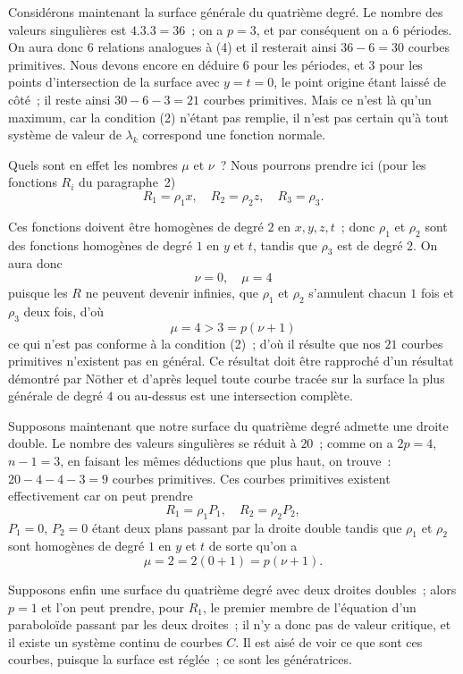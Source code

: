 \documentclass{article}
\begin{document}
Considérons maintenant la surface générale du quatrième degré. Le nombre des valeurs singulières est $4.3.3 = 36$~; on a $p = 3$, et par
conséquent on a $6$ périodes. On aura donc $6$ relations analogues à (4) et il resterait ainsi $36 - 6 = 30$ courbes primitives. Nous devons encore en déduire $6$ pour les périodes, et $3$ pour les points d'intersection de la surface avec $y = t = 0$, le point origine étant laissé de côté~; il reste ainsi $30 - 6 - 3 = 21$ courbes primitives. Mais ce n'est là qu'un maximum, car la condition (2) n'étant pas remplie, il n'est pas certain qu'à tout système de valeur de $\lambda_{k}$ correspond une fonction normale.

Quels sont en effet les nombres $\mu$ et $\nu$~? Nous pourrons prendre ici (pour les fonctions $R_{i}$ du paragraphe~2)
\[
R_{1} = \rho_{1} x, \quad R_{2} = \rho_{2} z, \quad R_{3} = \rho_{3}.
\]

Ces fonctions doivent être homogènes de degré $2$ en $x, y, z, t$~; donc $\rho_{1}$ et $\rho_{2}$ sont des fonctions homogènes de degré $1$ en $y$ et $t$, tandis que $\rho_{3}$ est de degré $2$. On aura donc
\[
\nu = 0, \quad \mu = 4
\]
puisque les $R$ ne peuvent devenir infinies, que $\rho_{1}$ et $\rho_{2}$ s'annulent chacun $1$ fois et $\rho_{3}$ deux fois, d'où
\[
\mu = 4 > 3 = p(\nu + 1)
\]
ce qui n'est pas conforme à la condition (2)~; d'où il résulte que nos $21$ courbes primitives n'existent pas en général. Ce résultat doit être rapproché d'un résultat démontré par Nöther et d'après lequel toute courbe tracée sur la surface la plus générale de degré $4$ ou au-dessus est une intersection complète.

Supposons maintenant que notre surface du quatrième degré admette une droite double. Le nombre des valeurs singulières se réduit à $20$~; comme on a $2p = 4$, $n - 1 = 3$, en faisant les mêmes déductions que plus haut, on trouve~: $20 - 4 - 4 - 3 = 9$ courbes primitives. Ces courbes primitives existent effectivement car on peut prendre
\[
R_{1} = \rho_{1} P_{1}, \quad R_{2} = \rho_{2} P_{2},
\]
$P_{1} = 0$, $P_{2} = 0$ étant deux plans passant par la droite double tandis que $\rho_{1}$ et $\rho_{2}$ sont homogènes de degré $1$ en $y$ et $t$ de sorte qu'on a
\[
\mu = 2 = 2(0 + 1) = p(\nu + 1).
\]

Supposons enfin une surface du quatrième degré avec deux droites doubles~; alors $p = 1$ et l'on peut prendre, pour $R_{1}$, le premier membre de l'équation d'un paraboloïde passant par les deux droites~; il n'y a donc pas de valeur critique, et il existe un système continu de courbes $C$. Il est aisé de voir ce que sont ces courbes, puisque la surface est réglée~; ce sont les génératrices.
\end{document}
